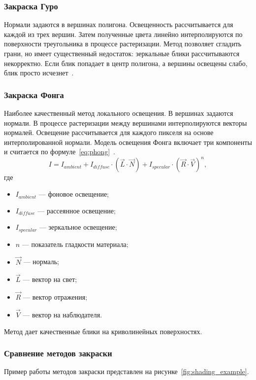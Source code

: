 \subsubsection{Закраска Гуро}
Нормали задаются в вершинах полигона. Освещенность рассчитывается для каждой из трех вершин. Затем полученные цвета линейно интерполируются по поверхности треугольника в процессе растеризации.
Метод позволяет сгладить грани, но имеет существенный недостаток: зеркальные блики рассчитываются некорректно. Если блик попадает в центр полигона, а вершины освещены слабо, блик просто исчезнет~\cite{porev2002}.

\subsubsection{Закраска Фонга}
Наиболее качественный метод локального освещения. В вершинах задаются нормали. В процессе растеризации между вершинами интерполируются векторы нормалей. Освещение рассчитывается для каждого пикселя на основе интерполированной нормали.
Модель освещения Фонга включает три компоненты и считается по формуле~\eqref{eq:phong}~\cite{rogers1989}.
\begin{equation}
	I = I_{ambient} + I_{diffuse} \cdot (\vec{L} \cdot \vec{N}) + I_{specular} \cdot (\vec{R} \cdot \vec{V})^n,
	\label{eq:phong}
\end{equation}
где
\begin{itemize}
	\item $I_{ambient}$ --- фоновое освещение;
	\item $I_{diffuse}$ --- рассеянное освещение;
	\item $I_{specular}$ --- зеркальное освещение;
	\item $n$ --- показатель гладкости материала;
	\item $\vec{N}$ --- нормаль;
	\item $\vec{L}$ --- вектор на свет;
	\item $\vec{R}$ --- вектор отражения;
	\item $\vec{V}$ --- вектор на наблюдателя.
\end{itemize}
Метод дает качественные блики на криволинейных поверхностях.

\subsubsection{Сравнение методов закраски}

Пример работы методов закраски представлен на рисунке~\ref{fig:shading_example}.

